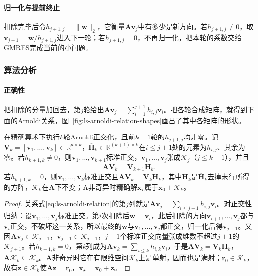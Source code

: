\paragraph{归一化与提前终止}
扣除完毕后令$h_{j+1,j}=\lVert\bm w\rVert_2$，它衡量$\bm A\bm v_j$中有多少是新方向。若$h_{j+1,j}\ne0$，取$\bm v_{j+1}=\bm w/h_{j+1,j}$进入下一轮；若$h_{j+1,j}=0$，不再归一化，把本轮的系数交给GMRES完成当前的小问题。

\subsubsection{算法分析}

\paragraph{正确性}
把扣除的分量加回去，第$j$轮给出$\bm A\bm v_j=\sum_{i=1}^{j+1}h_{i,j}\bm v_i$。把各轮合成矩阵，就得到下面的Arnoldi关系，图~\ref{fig:ls-arnoldi-relation-shapes}画出了其中各矩阵的形状。

\begin{theorem}[Arnoldi关系]
\label{thm:ls-arnoldi-relation}
在精确算术下执行$k$轮Arnoldi正交化，且前$k-1$轮的$h_{j+1,j}$均非零。记$\bm V_k=[\bm v_1,\ldots,\bm v_k]\in\mathbb R^{d\times k}$，$\overline{\bm H}_k\in\mathbb R^{(k+1)\times k}$在$i\le j+1$处的元素为$h_{i,j}$、其余为零。若$h_{k+1,k}\ne0$，则$\bm v_1,\ldots,\bm v_{k+1}$标准正交，$\bm v_1,\ldots,\bm v_j$张成$\mathcal K_j$（$j\le k+1$），并且
\begin{equation}
 \label{eq:ls-arnoldi-relation}
 \bm A\bm V_k=\bm V_{k+1}\overline{\bm H}_k .
\end{equation}
若$h_{k+1,k}=0$，则$\bm v_1,\ldots,\bm v_k$标准正交且$\bm A\bm V_k=\bm V_k\bm H_k$，其中$\bm H_k$是$\overline{\bm H}_k$去掉末行所得的方阵，$\mathcal K_k$在$\bm A$下不变；$\bm A$非奇异时精确解$\bm x_\star$属于$\bm x_0+\mathcal K_k$。
\end{theorem}

\begin{proof}
关系式\eqref{eq:ls-arnoldi-relation}的第$j$列就是$\bm A\bm v_j=\sum_{i\le j+1}h_{i,j}\bm v_i$。对正交性归纳：设$\bm v_1,\ldots,\bm v_j$标准正交。第$i$次扣除后$\bm w\perp\bm v_i$，此后扣除的方向$\bm v_{i+1},\ldots,\bm v_j$都与$\bm v_i$正交，不破坏这一关系，所以最终的$\bm w$与$\bm v_1,\ldots,\bm v_j$都正交，归一化后得$\bm v_{j+1}$。又因$\bm A\bm v_j\in\mathcal K_{j+1}$，$\bm v_{j+1}\in\mathcal K_{j+1}$，$j+1$个标准正交向量张成维数不超过$j+1$的$\mathcal K_{j+1}$。若$h_{k+1,k}=0$，第$k$列成为$\bm A\bm v_k=\sum_{i\le k}h_{i,k}\bm v_i$，于是$\bm A\bm V_k=\bm V_k\bm H_k$，$\bm A\mathcal K_k\subseteq\mathcal K_k$。$\bm A$非奇异时它在有限维空间$\mathcal K_k$上是单射，因而也是满射；$\bm r_0\in\mathcal K_k$，故有$\bm z\in\mathcal K_k$使$\bm A\bm z=\bm r_0$，$\bm x_\star=\bm x_0+\bm z$。
\end{proof}

